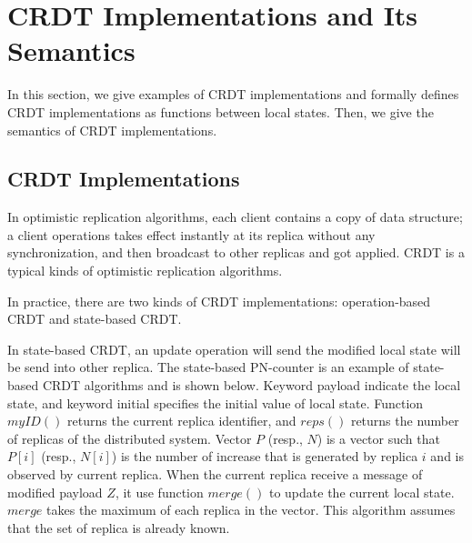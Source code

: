 
\section{CRDT Implementations and Its Semantics}
\label{sec:CRDT implementations and its semantics}

In this section, we give examples of CRDT implementations and formally defines CRDT implementations as functions between local states. Then, we give the semantics of CRDT implementations.


\subsection{CRDT Implementations}
\label{subsec:CRDT implementations}

In optimistic replication algorithms, each client contains a copy of data structure; a client operations takes effect instantly at its replica without any synchronization, and then broadcast to other replicas and got applied. CRDT is a typical kinds of optimistic replication algorithms.

In practice, there are two kinds of CRDT implementations: operation-based CRDT and state-based CRDT.

In state-based CRDT, an update operation will send the modified local state will be send into other replica. The state-based PN-counter is an example of state-based CRDT algorithms and is shown below. Keyword payload indicate the local state, and keyword initial specifies the initial value of local state. Function $myID()$ returns the current replica identifier, and $reps()$ returns the number of replicas of the distributed system. Vector $P$ (resp., $N$) is a vector such that $P[i]$ (resp., $N[i]$) is the number of increase that is generated by replica $i$ and is observed by current replica. When the current replica receive a message of modified payload $Z$, it use function $merge()$ to update the current local state. $merge$ takes the maximum of each replica in the vector. This algorithm assumes that the set of replica is already known.

